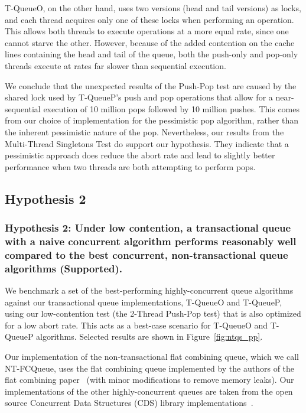 T-QueueO, on the other hand, uses two versions (head and tail versions) as locks, and each thread acquires only one of these locks when performing an operation. This allows both threads to execute operations at a more equal rate, since one cannot starve the other. However, because of the added contention on the cache lines containing the head and tail of the queue, both the push-only and pop-only threads execute at rates far slower than sequential execution.

We conclude that the unexpected results of the Push-Pop test are caused by the shared lock used by T-QueueP's push and pop operations that allow for a near-sequential execution of 10 million pops followed by 10 million pushes. This comes from our choice of implementation for the pessimistic pop algorithm, rather than the inherent pessimistic nature of the pop. Nevertheless, our results from the Multi-Thread Singletons Test do support our hypothesis. They indicate that a pessimistic approach does reduce the abort rate and lead to slightly better performance when two threads are both attempting to perform pops.

\vspace{12pt}
\noindent{}


\subsection{Hypothesis 2}
\subsubsection{Hypothesis 2: Under low contention, a transactional queue with a naive concurrent algorithm performs reasonably well compared to the best concurrent, non-transactional queue algorithms (Supported).}

We benchmark a set of the best-performing highly-concurrent queue algorithms against our transactional queue implementations, T-QueueO and T-QueueP, using our low-contention test (the 2-Thread Push-Pop test) that is also optimized for a low abort rate. This acts as a best-case scenario for T-QueueO and T-QueueP algorithms. Selected results are shown in Figure~\ref{fig:ntqs_pp}.

Our implementation of the non-transactional flat combining queue, which we call NT-FCQueue, uses the flat combining queue implemented by the authors of the flat combining paper~\cite{flatcombining} (with minor modifications to remove memory leaks). Our implementations of the other highly-concurrent queues are taken from the open source Concurrent Data Structures (CDS) library implementations~\cite{libcds}. 

